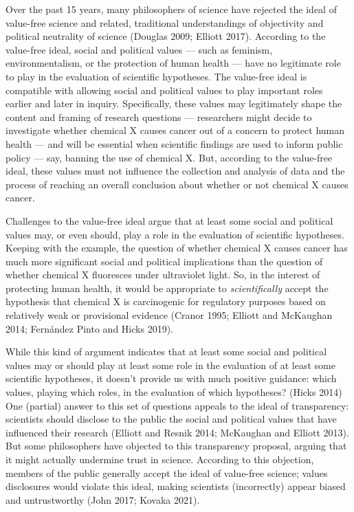 \documentclass[
  letterpaper,
  DIV=11,
  numbers=noendperiod]{scrartcl}
\begin{document}
Over the past 15 years, many philosophers of science have rejected the
ideal of value-free science and related, traditional understandings of
objectivity and political neutrality of science (Douglas 2009; Elliott
2017). According to the value-free ideal, social and political values
--- such as feminism, environmentalism, or the protection of human
health --- have no legitimate role to play in the evaluation of
scientific hypotheses. The value-free ideal is compatible with allowing
social and political values to play important roles earlier and later in
inquiry. Specifically, these values may legitimately shape the content
and framing of research questions --- researchers might decide to
investigate whether chemical X causes cancer out of a concern to protect
human health --- and will be essential when scientific findings are used
to inform public policy --- say, banning the use of chemical X. But,
according to the value-free ideal, these values must not influence the
collection and analysis of data and the process of reaching an overall
conclusion about whether or not chemical X causes cancer.

Challenges to the value-free ideal argue that at least some social and
political values may, or even should, play a role in the evaluation of
scientific hypotheses. Keeping with the example, the question of whether
chemical X causes cancer has much more significant social and political
implications than the question of whether chemical X fluoresces under
ultraviolet light. So, in the interest of protecting human health, it
would be appropriate to \emph{scientifically} accept the hypothesis that
chemical X is carcinogenic for regulatory purposes based on relatively
weak or provisional evidence (Cranor 1995; Elliott and McKaughan 2014;
Fernández Pinto and Hicks 2019).

While this kind of argument indicates that at least some social and
political values may or should play at least some role in the evaluation
of at least some scientific hypotheses, it doesn't provide us with much
positive guidance: which values, playing which roles, in the evaluation
of which hypotheses? (Hicks 2014) One (partial) answer to this set of
questions appeals to the ideal of transparency: scientists should
disclose to the public the social and political values that have
influenced their research (Elliott and Resnik 2014; McKaughan and
Elliott 2013). But some philosophers have objected to this transparency
proposal, arguing that it might actually undermine trust in science.
According to this objection, members of the public generally accept the
ideal of value-free science; values disclosures would violate this
ideal, making scientists (incorrectly) appear biased and untrustworthy
(John 2017; Kovaka 2021).
\end{document}

